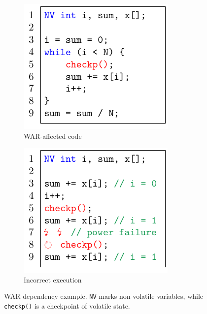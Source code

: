 \begin{figure}
    \begin{subfigure}{0.49\columnwidth}
        \includegraphics[width=\columnwidth]{figures/war-example.pdf}
        \caption{WAR-affected code}
        \label{fig:war-example}
    \end{subfigure}
    \begin{subfigure}{0.49\columnwidth}
        \includegraphics[width=\columnwidth]{figures/war-execution.pdf}
        \caption{Incorrect execution}
        \label{fig:war-execution}
    \end{subfigure}
    \caption{WAR dependency example. \texttt{NV} marks non-volatile variables,
    while \texttt{checkp()} is a checkpoint of volatile state.}
    \label{fig:war}
\end{figure}


